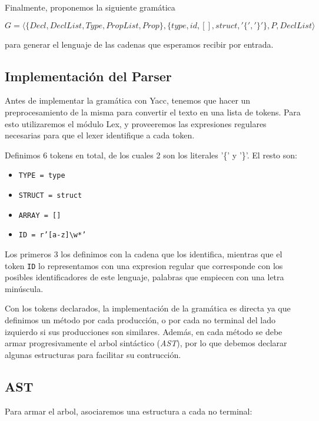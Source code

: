Finalmente, proponemos la siguiente gramática

\[
G = \langle\{Decl, DeclList, Type, PropList, Prop\}, \{type, id, [], struct, '\{', '\}'\}, P, DeclList\rangle
\]

para generar el lenguaje de las cadenas que esperamos recibir por entrada.

\subsection{Implementación del Parser}

Antes de implementar la gramática con Yacc, tenemos que hacer un
preprocesamiento de la misma para convertir el texto en una lista de tokens.
Para esto utilizaremos el módulo Lex, y proveeremos las expresiones regulares
necesarias para que el lexer identifique a cada token.

Definimos 6 tokens en total, de los cuales 2 son los literales '\{' y '\}'. El
resto son:

\begin{itemize}
    \item \texttt{TYPE = type}
    \item \texttt{STRUCT = struct} 
    \item \texttt{ARRAY = []} 
    \item \texttt{ID = r'[a-z]\textbackslash w*'}
\end{itemize}

Los primeros 3 los definimos con la cadena que los identifica, mientras que el
token \texttt{ID} lo representamos con una expresion regular que corresponde
con los posibles identificadores de este lenguaje, palabras que empiecen con
una letra minúscula.

Con los tokens declarados, la implementación de la gramática es directa ya que
definimos un método por cada producción, o por cada no terminal del lado
izquierdo si sus producciones son similares. Además, en cada método se debe
armar progresivamente el arbol sintáctico (\textit{AST}), por lo que debemos
declarar algunas estructuras para facilitar su contrucción.

\subsection{AST}
\label{subsec:ast}

Para armar el arbol, asociaremos una estructura a cada no terminal:

